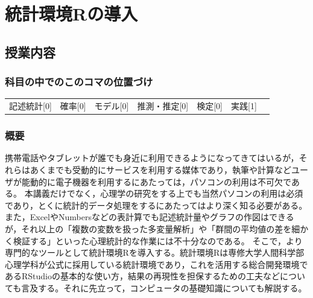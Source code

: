 \section{統計環境Rの導入}
\label{s03_introR}
\subsection{授業内容}
\subsubsection{科目の中でのこのコマの位置づけ}
\begin{tabular}[t]{ccccccc}
	記述統計[0] & 確率[0] & モデル[0] & 推測・推定[0] & 検定[0] & 実践[1]
\end{tabular}
\subsubsection{概要}
携帯電話やタブレットが誰でも身近に利用できるようになってきてはいるが，それらはあくまでも受動的にサービスを利用する媒体であり，執筆や計算などユーザが能動的に電子機器を利用するにあたっては，パソコンの利用は不可欠である。
本講義だけでなく，心理学の研究をする上でも当然パソコンの利用は必須であり，とくに統計的データ処理をするにあたってはより深く知る必要がある。また，ExcelやNumbersなどの表計算でも記述統計量やグラフの作図はできるが，それ以上の「複数の変数を扱った多変量解析」や「群間の平均値の差を細かく検証する」といった心理統計的な作業には不十分なのである。
そこで，より専門的なツールとして統計環境Rを導入する。統計環境Rは専修大学人間科学部心理学科が公式に採用している統計環境であり，これを活用する総合開発環境であるRStudioの基本的な使い方，結果の再現性を担保するための工夫などについても言及する。それに先立って，コンピュータの基礎知識についても解説する。
